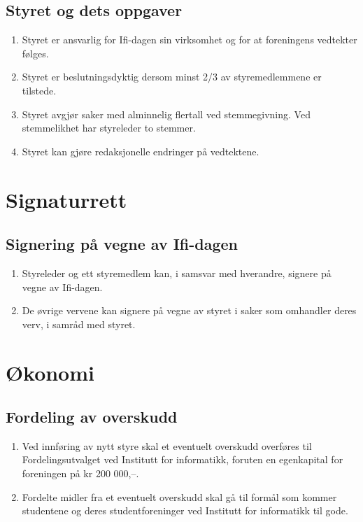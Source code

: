\documentclass[norsk,a4paper]{article}
\begin{document}
\subsection{Styret og dets oppgaver}
\begin{enumerate}
    \item{Styret er ansvarlig for Ifi-dagen sin virksomhet og for at foreningens vedtekter følges.}
    \item{Styret er beslutningsdyktig dersom minst 2/3 av styremedlemmene er tilstede.}
    \item{Styret avgjør saker med alminnelig flertall ved stemmegivning. Ved stemmelikhet har styreleder to stemmer.}
    \item{Styret kan gjøre redaksjonelle endringer på vedtektene.}
\end{enumerate}

\section{Signaturrett}
\subsection{Signering på vegne av Ifi-dagen}
\begin{enumerate}
    \item{Styreleder og ett styremedlem kan, i samsvar med hverandre, signere på vegne av Ifi-dagen.}
    \item{De øvrige vervene kan signere på vegne av styret i saker som omhandler deres verv, i samråd med styret.}
\end{enumerate}

\section{Økonomi\label{sec:okonomi}}
\subsection{Fordeling av overskudd}
\begin{enumerate}
    \item{Ved innføring av nytt styre skal et eventuelt overskudd overføres til Fordelingsutvalget ved Institutt for informatikk, foruten en egenkapital for foreningen på kr 200 000,--.}
    \item{Fordelte midler fra et eventuelt overskudd skal gå til formål som kommer studentene og deres studentforeninger ved Institutt for informatikk til gode.}
\end{enumerate}
\end{document}
